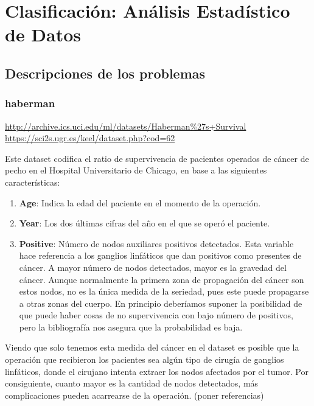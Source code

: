 \section{Clasificación: Análisis Estadístico de Datos}

\subsection{Descripciones de los problemas}

\subsubsection{haberman}

\url{http://archive.ics.uci.edu/ml/datasets/Haberman\%27s+Survival}
\url{https://sci2s.ugr.es/keel/dataset.php?cod=62}

Este dataset codifica el ratio de supervivencia de pacientes operados de
cáncer de pecho en el Hospital Universitario de Chicago, en base a las
siguientes características:

\begin{enumerate}
\def\labelenumi{\arabic{enumi}.}
    \item \textbf{Age}: Indica la edad del paciente en el momento de la operación.
    \item \textbf{Year}: Los dos últimas cifras del año en el que se operó el paciente.
    \item \textbf{Positive}: Número de nodos auxiliares positivos detectados. Esta variable hace referencia a los ganglios linfáticos que dan positivos como presentes de cáncer. A mayor número de nodos detectados, mayor es la gravedad del cáncer. Aunque normalmente la primera zona de
    propagación del cáncer son estos nodos, no es la única medida de la seriedad, pues este puede propagarse a otras zonas del cuerpo. En principio deberíamos suponer la posibilidad de que puede haber cosas de no supervivencia con bajo número de positivos, pero la bibliografía nos asegura que la probabilidad es baja.
\end{enumerate}

Viendo que solo tenemos esta medida del cáncer en el dataset es posible que la operación que recibieron los pacientes sea algún tipo de cirugía de ganglios linfáticos, donde el cirujano intenta extraer los nodos afectados por el tumor. Por consiguiente, cuanto mayor es la cantidad de nodos detectados, más complicaciones pueden acarrearse de la operación. (poner referencias)

